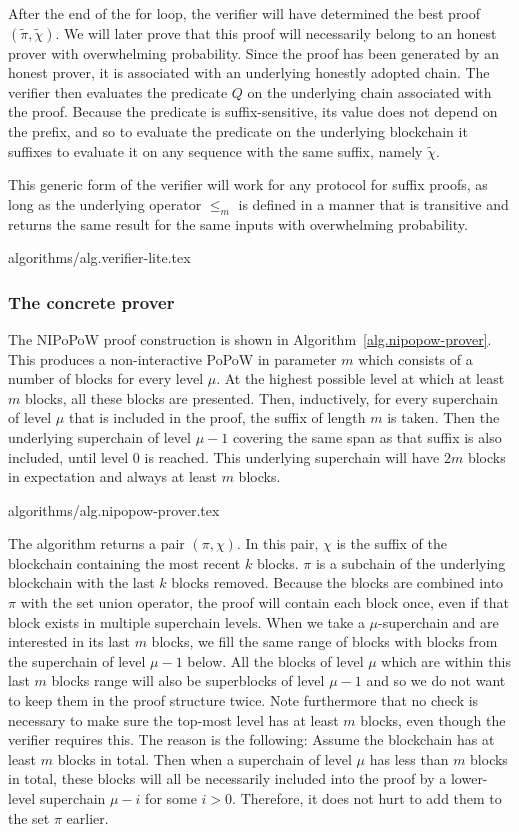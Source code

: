 After the end of the for loop, the verifier will have determined the best proof
$(\tilde\pi, \tilde\chi)$. We will later prove that this proof will necessarily
belong to an honest prover with overwhelming probability. Since the proof has
been generated by an honest prover, it is associated with an underlying honestly
adopted chain. The verifier then evaluates the predicate $Q$ on the underlying
chain associated with the proof. Because the predicate is suffix-sensitive, its
value does not depend on the prefix, and so to evaluate the predicate on the
underlying blockchain it suffixes to evaluate it on any sequence with the same
suffix, namely $\tilde\chi$.

This generic form of the verifier will work for any protocol for suffix proofs,
as long as the underlying operator $\leq_m$ is defined in a manner that is
transitive and returns the same result for the same inputs with overwhelming
probability.

{algorithms/alg.verifier-lite.tex}

\subsubsection{The concrete prover}

The NIPoPoW proof construction is shown in Algorithm~\ref{alg.nipopow-prover}.
This produces a non-interactive PoPoW in parameter $m$ which consists of a
number of blocks for every level $\mu$. At the highest possible level at which
at least $m$ blocks, all these blocks are presented. Then, inductively, for
every superchain of level $\mu$ that is included in the proof, the suffix of
length $m$ is taken. Then the underlying superchain of level $\mu - 1$ covering
the same span as that suffix is also included, until level $0$ is reached. This
underlying superchain will have $2m$ blocks in expectation and always at least
$m$ blocks.

{algorithms/alg.nipopow-prover.tex}

The algorithm returns a pair $(\pi, \chi)$. In this pair, $\chi$ is the
suffix of the blockchain containing the most recent $k$ blocks. $\pi$ is
a subchain of the underlying blockchain with the last $k$ blocks removed.
Because the blocks are combined into $\pi$ with the set union operator,
the proof will contain each block once, even if that block exists in multiple
superchain levels. When we take a $\mu$-superchain and are interested
in its last $m$ blocks, we fill the same range of blocks with blocks from the
superchain of level $\mu - 1$ below.  All the blocks of level $\mu$ which are
within this last $m$ blocks range will also be superblocks of level $\mu - 1$
and so we do not want to keep them in the proof structure twice.  Note
furthermore that no check is necessary to make sure the top-most level has at
least $m$ blocks, even though the verifier requires this. The reason is the
following: Assume the blockchain has at least $m$ blocks in total. Then when a
superchain of level $\mu$ has less than $m$ blocks in total, these blocks will
all be necessarily included into the proof by a lower-level superchain $\mu -
i$ for some $i > 0$.  Therefore, it does not hurt to add them to the set
$\pi$ earlier.

